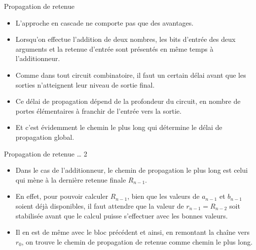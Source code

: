 \documentclass[presentation]{beamer}
\begin{document}
\begin{frame}[label={sec:org55c4491}]{Propagation de retenue}
\begin{itemize}
\item L'approche en cascade ne comporte pas que des avantages.

\item Lorsqu'on effectue l'addition de deux nombres, les bits d'entrée des deux arguments et la retenue d'entrée sont présentés en même temps à l'additionneur.

\item Comme dans tout circuit combinatoire, il faut un certain délai avant que les sorties n'atteignent leur niveau de sortie final.

\item Ce délai de propagation dépend de la profondeur du circuit, en nombre de portes élémentaires à franchir de l'entrée vers la sortie.

\item Et c'est évidemment le chemin le plus long qui détermine le délai de propagation global.
\end{itemize}
\end{frame}

\begin{frame}[label={sec:org5400924}]{Propagation de retenue \ldots{} 2}
\begin{itemize}
\item Dans le cas de l'additionneur, le chemin de propagation le plus long est celui qui mène à la dernière retenue finale \(R_{n-1}\).

\item En effet, pour pouvoir calculer \(R_{n-1}\), bien que les valeurs de \(a_{n-1}\) et \(b_{n-1}\) soient déjà disponibles, il faut attendre que la valeur de \(r_{n-1} = R_{n-2}\) soit stabilisée avant que le calcul puisse s'effectuer avec les bonnes valeurs.

\item Il en est de même avec le bloc précédent et ainsi, en remontant la chaîne vers \(r_0\), on trouve le chemin de propagation de retenue comme chemin le plus long.
\end{itemize}
\end{frame}
\end{document}
